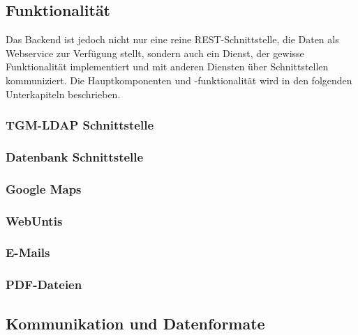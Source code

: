 	\subsection{Funktionalität}
	Das Backend ist jedoch nicht nur eine reine REST-Schnittstelle, die Daten als Webservice zur Verfügung stellt, sondern auch ein Dienst, der gewisse Funktionalität implementiert und mit anderen Diensten über Schnittstellen kommuniziert. Die Hauptkomponenten und -funktionalität wird in den folgenden Unterkapiteln beschrieben.
		\subsubsection{TGM-LDAP Schnittstelle}
		\subsubsection{Datenbank Schnittstelle}
		\subsubsection{Google Maps}
		\subsubsection{WebUntis}
		\subsubsection{E-Mails}
		\subsubsection{PDF-Dateien}
	\subsection{Kommunikation und Datenformate}
